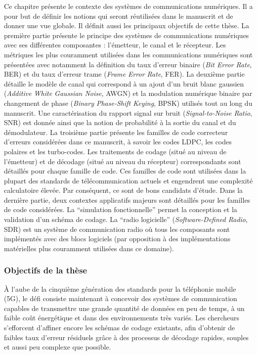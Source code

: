 Ce chapitre présente le contexte des systèmes de communications numériques. Il a
pour but de définir les notions qui seront réutilisées dans le manuscrit et de
donner une vue globale. Il définit aussi les principaux objectifs de cette
thèse. La première partie présente le principe des systèmes de communications
numériques avec ses différentes composantes : l'émetteur, le canal et le
récepteur. Les métriques les plus couramment utilisées dans les communications
numériques sont présentées avec notamment la définition du taux d'erreur binaire
(\emph{Bit Error Rate}, BER) et du taux d'erreur trame (\emph{Frame Error Rate},
FER). La deuxième partie détaille le modèle de canal qui correspond à un ajout
d'un bruit blanc gaussien (\emph{Additive White Gaussian Noise}, AWGN) et la
modulation numérique binaire par changement de phase (\emph{Binary Phase-Shift
Keying}, BPSK) utilisés tout au long du manuscrit. Une caractérisation du
rapport signal sur bruit (\emph{Signal-to-Noise Ratio}, SNR) est donnée ainsi
que la notion de probabilité à la sortie du canal et du démodulateur. La
troisième partie présente les familles de code correcteur d'erreurs considérées
dans ce manuscrit, à savoir les codes LDPC, les codes polaires et les
turbo-codes. Les traitements de codage (situé au niveau de l’émetteur) et de
décodage (situé au niveau du récepteur) correspondants sont détaillés pour
chaque famille de code. Ces familles de code sont utilisées dans la plupart des
standards de télécommunication actuels et engendrent une complexité calculatoire
élevée. Par conséquent, ce sont de bons candidats d'étude. Dans la dernière
partie, deux contextes applicatifs majeurs sont détaillés pour les familles de
code considérées. La ``simulation fonctionnelle'' permet la conception et la
validation d'un schéma de codage. La ``radio logicielle''
(\emph{Software-Defined Radio}, SDR) est un système de communication radio où
tous les composants sont implémentés avec des blocs logiciels (par opposition à
des implémentations matérielles plus couramment utilisées dans ce domaine).

\subsubsection*{Objectifs de la thèse}

À l'aube de la cinquième génération des standards pour la téléphonie mobile
(5G), le défi consiste maintenant à concevoir des systèmes de communication
capables de transmettre une grande quantité de données en peu de temps, à un
faible coût énergétique et dans des environnements très variés. Les chercheurs
s'efforcent d'affiner encore les schémas de codage existants, afin d'obtenir de
faibles taux d'erreur résiduels grâce à des processus de décodage rapides,
souples et aussi peu complexe que possible.

